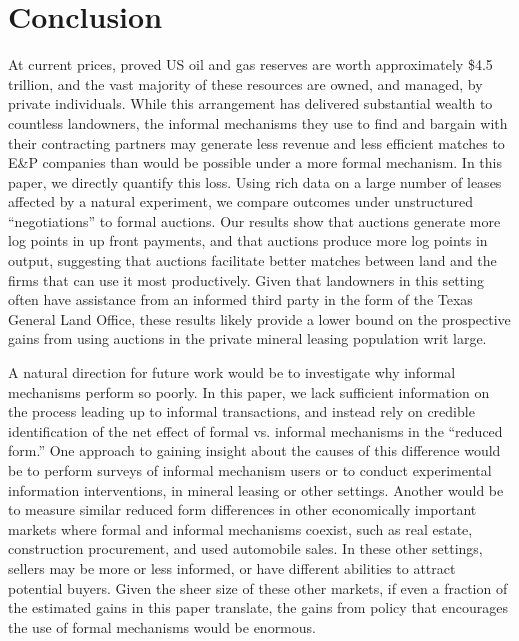 \documentclass[12pt]{article}
\newcommand{\inputy}[1]{\unskip}
\begin{document}
\section{Conclusion}\label{sec:Conclusion}

At current prices, proved US oil and gas reserves are worth approximately \$4.5 trillion, and the vast majority of these resources are owned, and managed, by private individuals.  While this arrangement has delivered substantial wealth to countless landowners, the informal mechanisms they use to find and bargain with their contracting partners may generate less revenue and less efficient matches to E\&P companies than would be possible under a more formal mechanism.  In this paper, we directly quantify this loss.  Using rich data on a large number of leases affected by a natural experiment, we compare outcomes under unstructured ``negotiations'' to formal auctions.  Our results show that auctions generate \inputy{../output/estimates/Bonus_Grid10Yr_log.tex} more log points in up front payments, and that auctions produce \inputy{../output/estimates/Poisson_LeaseRevenue_Grid10Yr.tex} more log points in output, suggesting that auctions facilitate better matches between land and the firms that can use it most productively. Given that landowners in this setting often have assistance from an informed third party in the form of the Texas General Land Office, these results likely provide a lower bound on the prospective gains from using auctions in the private mineral leasing population writ large. 

A natural direction for future work would be to investigate why informal mechanisms perform so poorly. In this paper, we lack sufficient information on the process leading up to informal transactions, and instead rely on credible identification of the net effect of formal vs. informal mechanisms in the ``reduced form.''  One approach to gaining insight about the causes of this difference would be to perform surveys of informal mechanism users or to conduct experimental information interventions, in mineral leasing or other settings.  Another would be to measure similar reduced form differences in other economically important markets where formal and informal mechanisms coexist, such as real estate, construction procurement, and used automobile sales. In these other settings, sellers may be more or less informed, or have different abilities to attract potential buyers. Given the sheer size of these other markets, if even a fraction of the estimated gains in this paper translate, the gains from policy that encourages the use of formal mechanisms would be enormous.  
\end{document}
